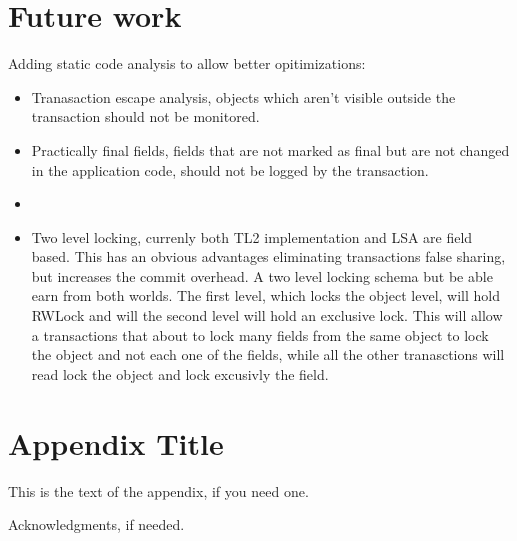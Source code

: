\documentclass[preprint,natbib,10pt]{sigplanconf}
\begin{document}
\section{Future work}
Adding static code analysis to allow better opitimizations:
\begin{itemize}
 \item Tranasaction escape analysis, objects which aren't visible outside the transaction should not be monitored.
 \item Practically final fields, fields that are not marked as final but are not changed in the application code, should not be logged by the transaction.
 \item 
 \item Two level locking, currenly both TL2 implementation and LSA are field based. This has an obvious advantages eliminating transactions false sharing, but increases the commit overhead. A two level locking schema but be able earn from both worlds. The first level, which locks the object level, will hold RWLock and will the second level will hold an exclusive lock. This will allow a transactions that about to lock many fields from the same object to lock the object and not each one of the fields, while all the other tranasctions will read lock the object and lock excusivly the field.


\end{itemize}

\appendix
\section{Appendix Title}

This is the text of the appendix, if you need one.

\acks

Acknowledgments, if needed.



%
%
\end{document}
